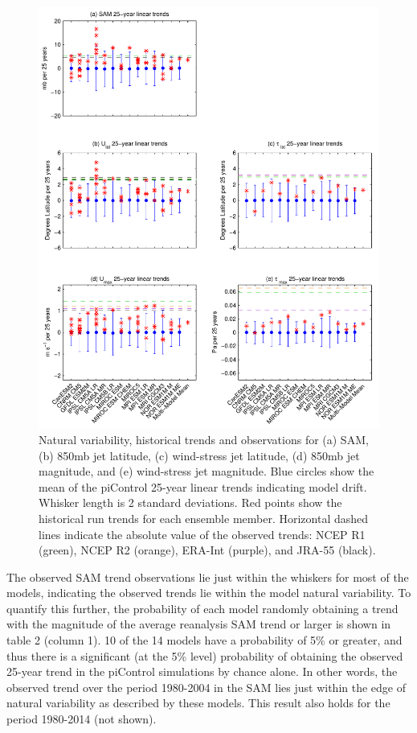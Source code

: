 \begin{figure}
\noindent
\includegraphics[width=1\linewidth]{figures/chapter-SHcirc/2014jgrl-p02.pdf}
\caption{Natural variability, historical trends and observations for (a) SAM,
(b) 850mb jet latitude, (c) wind-stress jet latitude, (d) 850mb jet magnitude,
and (e) wind-stress jet magnitude. Blue circles show the mean of the piControl
25-year linear trends indicating model drift. Whisker length is 2 standard
deviations. Red points show the historical run trends for each ensemble member.
Horizontal dashed lines indicate the absolute value of the observed trends: NCEP
R1 (green), NCEP R2 (orange), ERA-Int (purple), and JRA-55 (black).}
\label{fig:ch2_fig2}
\end{figure}

The observed SAM trend observations lie just within the whiskers for most of the
models, indicating the observed trends lie within the model natural variability.
To quantify this further, the probability of each model randomly obtaining a
trend with the magnitude of the average reanalysis SAM trend or larger is shown
in table 2 (column 1). 10 of the 14 models have a probability of 5\% or greater,
and thus there is a significant (at the 5\% level) probability of  obtaining the
observed 25-year trend in the piControl simulations by chance alone. In other
words, the observed trend over the period 1980-2004 in the SAM lies just within
the edge of natural variability as described by these models. This result also
holds for the period 1980-2014 (not shown).

